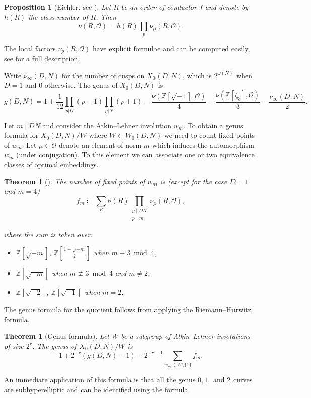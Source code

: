 \documentclass[12pt]{amsart}
\newcommand{\Z}{\mathbb{Z}}
\newcommand{\calO}{\mathcal{O}}
\numberwithin{equation}{subsection}
\newtheorem{theorem}[equation]{Theorem}
\theoremstyle{plain}\newtheorem{ithm}{Theorem}
\theoremstyle{plain}\newtheorem{iprop}[ithm]{Proposition}
\newtheorem{proposition}[equation]{Proposition}
\theoremstyle{definition}
\theoremstyle{remark}
\newcommand{\Order}{\calO} %
\newcommand{\Curve}[2]{X_0({#1},{#2})} %
\newcommand{\ALfull}[2]{W_0({#1},{#2})} %
\begin{document}
\begin{proposition}[Eichler, see {\cite[Proposition 1]{Ogg}}]
\label{prop:localembed}
Let $R$ be an order of conductor $f$ and denote by $h(R)$ the class number of $R$.
Then
\[ \nu(R,\Order) = h(R) \prod_{p} \nu_p(R, \Order).  \]
\end{proposition}

The local factors $\nu_p(R, \Order)$ have explicit formulae and can be computed easily, see  \cite[Theorem 2]{Ogg} for a full description.


Write $\nu_\infty(D,N)$ for the number of cusps on $\Curve{D}{N}$, which is $2^{\omega(N)}$ when $D  = 1$ and $0$ otherwise.
The genus of $\Curve{D}{N}$ is 
\[ g(D,N) =1 +  \frac{1}{12} \prod_{p | D} (p - 1) 
\prod_{p|N} (p+1)  -
\frac{\nu(\Z[\sqrt{-1}], \Order)}{4} - \frac{\nu(\Z[\zeta_3], \Order)}{3} - 
\frac{\nu_\infty(D,N)}{2}. \]



Let $m \mid DN$ and consider the Atkin--Lehner involution $w_m.$ To obtain a genus formula for $\Curve{D}{N}/W$ where $W\subset \ALfull{D}{N}$ we need to count fixed points of $w_m$. Let $\mu \in \Order$ denote an element of norm $m$ which induces the automorphism $w_m$ (under conjugation). To this element we can associate one or two equivalence classes of optimal embeddings.

\begin{theorem}[{\cite[(4)]{Ogg}}]
\label{thm:ALfixedpoints}
    The number of fixed points of $w_m$ is  (except for the case $D = 1$ and $m = 4$)
    \begin{equation} \label{eq:ALfixedpoints}
    f_m \coloneqq \sum_R h(R) \prod_{\substack{p \mid DN \\ p \nmid m}} \nu_p(R, \Order),
    \end{equation}

    where the sum is taken over:
    \begin{itemize}
       \item $\Z[\sqrt{-m}]$, $\Z[\frac{1+\sqrt{-m}}{2}]$ when $m \equiv 3 \bmod 4$,
        \item $\Z[\sqrt{-m}]$ when $m \not \equiv 3 \bmod 4$ and $m \ne 2$,
        \item  $\Z[\sqrt{-2}]$, $\Z[\sqrt{-1}]$ when $m=2$.
    \end{itemize}
\end{theorem}

The genus formula for the quotient follows from applying the Riemann--Hurwitz formula.
\begin{theorem}[Genus formula]
Let $ W$ be a subgroup of Atkin--Lehner involutions of size $2^r$.
    The genus of $\Curve{D}{N}/W$ is
    \[1 + 2^{-r}(g(D,N)-1) - 2^{-r-1}\sum_{w_m \in W\setminus \{1\}} f_m .\]
\end{theorem}
An immediate application of this formula is that all the genus  $0,1,$ and $2$ curves are subhyperelliptic and can be identified using the formula.
\end{document}
